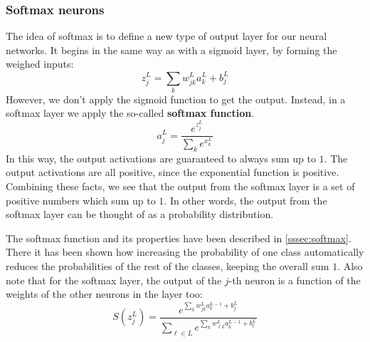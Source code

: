 \documentclass[12pt, letterpaper]{article}
\theoremstyle{definition}
\let\tb\textbf
\begin{document}
\subsubsection{Softmax neurons}
The idea of softmax is to define a new type of output layer for our neural networks. It begins in the same way as with a sigmoid layer, by forming the weighed inputs:
\newcommand{\jL}{_j^L}
\begin{equation}
z\jL = \sum_k w_{jk}^L a_k^L + b\jL
\end{equation}
However, we don't apply the sigmoid function to get the output. Instead, in a softmax layer we apply the so-called \tb{softmax function}.
\begin{equation}
a\jL = \frac{e^{z\jL}}{\sum_k e^{x_k^L}}
\end{equation}
In this way, the output activations are guaranteed to always sum up to $1$. The output activations are all positive, since the exponential function is positive. Combining these facts, we see that the output from the softmax layer is a set of positive numbers which sum up to $1$. In other words, the output from the softmax layer can be thought of as a probability distribution.

The softmax function and its properties have been described in \autoref{sssec:softmax}. There it has been shown how increasing the probability of one class automatically reduces the probabilities of the rest of the classes, keeping the overall sum $1$. Also note that for the softmax layer, the output of the $j$-th neuron is a function of the weights of the other neurons in the layer too:
\begin{equation*}
S(z\jL) = \frac{e^{\sum_k w_{jk}^L a_k^{L-1} +b_j^L}}{\sum_{\ell \in L}e^{\sum_k w_{\ell k}^L a_k^{L-1} +b_\ell^L}}
\end{equation*}
\end{document}
